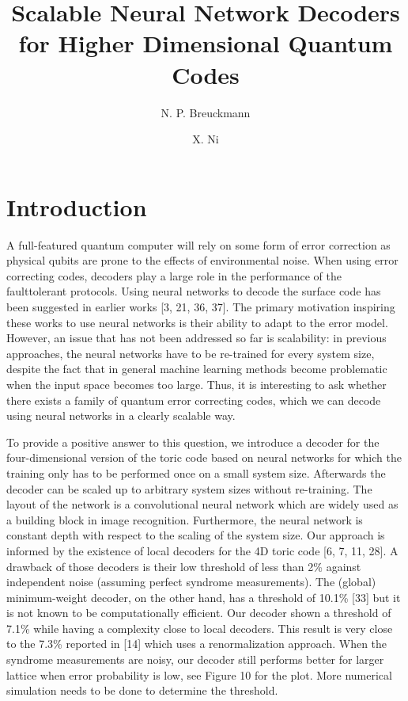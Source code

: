 \documentclass[]{compositionalityarticle}
\title{Scalable Neural Network Decoders for Higher Dimensional Quantum Codes}
\author[1]{N. P. Breuckmann}
\author[1,2]{X. Ni}
\affil[1]{Institute for Quantum Information, RWTH Aachen University, Germany}
\affil[2]{Max Planck Institute of Quantum Optics, Germany}
\begin{document}
\maketitle

\section{Introduction}

A full-featured quantum computer will rely on some form of error correction as physical qubits are prone to the effects of environmental noise. When using error correcting codes, decoders play a large role in the performance of the faulttolerant protocols. Using neural networks to decode the surface code has been suggested in earlier works [3, 21, 36, 37]. The primary motivation inspiring these works to use neural networks is their ability to adapt to the error model. However, an issue that has not been addressed so far is scalability: in previous approaches, the neural networks have to be re-trained for every system size, despite the fact that in general machine learning methods become problematic when the input space becomes too large. Thus, it is interesting to ask whether there exists a family of quantum error correcting codes, which we can decode using neural networks in a clearly scalable way.

To provide a positive answer to this question, we introduce a decoder for the four-dimensional version of the toric code based on neural networks for which the training only has to be performed once on a small system size. Afterwards the decoder can be scaled up to arbitrary system sizes without re-training. The layout of the network is a convolutional neural network which are widely used as a building block in image recognition. Furthermore, the neural network is constant depth with respect to
the scaling of the system size. Our approach is informed by the existence of local decoders for the 4D toric code [6, 7, 11, 28]. A drawback of those decoders is their low threshold of less than 2\% against independent noise (assuming perfect syndrome measurements). The (global) minimum-weight decoder, on the other hand, has a threshold of 10.1\% [33] but it is not known to be computationally efficient. Our decoder shown a threshold of 7.1\% while having a complexity close to local decoders.
This result is very close to the 7.3\% reported in [14] which uses a renormalization approach. When the syndrome measurements are noisy, our decoder still performs better for larger lattice when error probability is low, see Figure 10 for the plot. More numerical simulation needs to be done to determine the threshold. 
\end{document}

